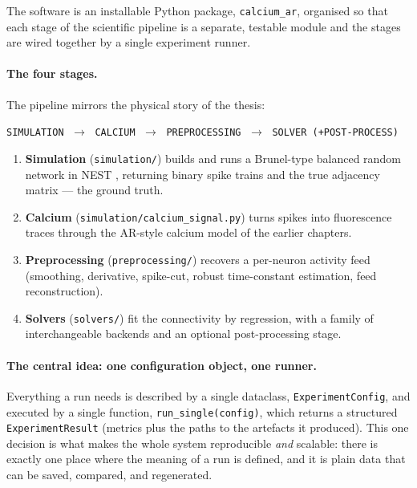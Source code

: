 \documentclass[11pt,a4paper]{article}
\newcommand{\code}[1]{\texttt{#1}}
\newcommand{\config}{\code{ExperimentConfig}}
\begin{document}
The software is an installable Python package, \code{calcium\_ar}, organised so that each
stage of the scientific pipeline is a separate, testable module and the stages are wired
together by a single experiment runner.

\paragraph{The four stages.}
The pipeline mirrors the physical story of the thesis:
\begin{center}
\code{SIMULATION} $\;\longrightarrow\;$ \code{CALCIUM} $\;\longrightarrow\;$
\code{PREPROCESSING} $\;\longrightarrow\;$ \code{SOLVER (+POST-PROCESS)}
\end{center}
\begin{enumerate}[leftmargin=1.6em]
  \item \textbf{Simulation} (\code{simulation/}) builds and runs a Brunel-type balanced
    random network in NEST \cite{nest}, returning binary spike trains and the true adjacency
    matrix --- the ground truth.
  \item \textbf{Calcium} (\code{simulation/calcium\_signal.py}) turns spikes into fluorescence
    traces through the AR-style calcium model of the earlier chapters.
  \item \textbf{Preprocessing} (\code{preprocessing/}) recovers a per-neuron activity feed
    (smoothing, derivative, spike-cut, robust time-constant estimation, feed reconstruction).
  \item \textbf{Solvers} (\code{solvers/}) fit the connectivity by regression, with a family
    of interchangeable backends and an optional post-processing stage.
\end{enumerate}

\paragraph{The central idea: one configuration object, one runner.}
Everything a run needs is described by a single dataclass, \config, and executed by a single
function, \code{run\_single(config)}, which returns a structured \code{ExperimentResult}
(metrics plus the paths to the artefacts it produced). This one decision is what makes the
whole system reproducible \emph{and} scalable: there is exactly one place where the meaning of a
run is defined, and it is plain data that can be saved, compared, and regenerated.
\end{document}
